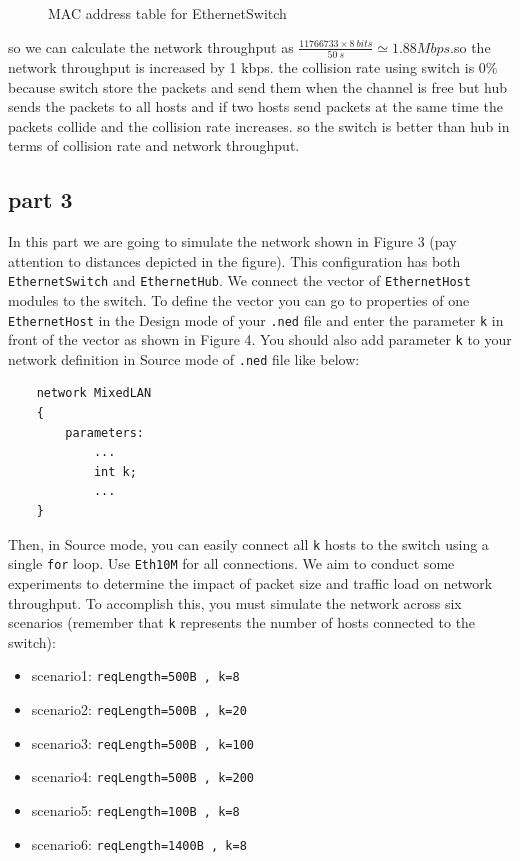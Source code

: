 \begin{qsolve}
\begin{qsolve}[]
\begin{figure}[H]
            \caption{MAC address table for EthernetSwitch}
        \end{figure}
        \splitqsolve[\splitqsolve]
        so we can calculate the network throughput as $\frac{11766733\times 8\ bits}{50\ s} \simeq  1.88 Mbps$.so the network throughput is increased by 1 kbps. the collision rate using switch is 0\% because switch store the packets and send them when the channel is free but hub sends the packets to all hosts and if two hosts send packets at the same time the packets collide and the collision rate increases. so the switch is better than hub in terms of collision rate and network throughput.
    \end{qsolve}
\end{qsolve}
\subsection{part 3}
In this part we are going to simulate the network shown in Figure 3 (pay attention to distances depicted in the figure). This configuration has both \texttt{EthernetSwitch} and \texttt{EthernetHub}. We connect the vector of \texttt{EthernetHost} modules to the switch. To define the vector you can go to properties of one \texttt{EthernetHost} in the Design mode of your \texttt{.ned} file and enter the parameter \texttt{k} in front of the vector as shown in Figure 4. You should also add parameter \texttt{k} to your network definition in Source mode of \texttt{.ned} file like below:
\begin{verbatim}
    network MixedLAN
    {
        parameters:
            ...
            int k;
            ...
    }
    \end{verbatim}
    
    Then, in Source mode, you can easily connect all \texttt{k} hosts to the switch using a single \texttt{for} loop. Use \texttt{Eth10M} for all connections. We aim to conduct some experiments to determine the impact of packet size and traffic load on network throughput. To accomplish this, you must simulate the network across six scenarios (remember that \texttt{k} represents the number of hosts connected to the switch):
    
    \begin{itemize}
        \item scenario1: \texttt{reqLength=500B , k=8}
        \item scenario2: \texttt{reqLength=500B , k=20}
        \item scenario3: \texttt{reqLength=500B , k=100}
        \item scenario4: \texttt{reqLength=500B , k=200}
        \item scenario5: \texttt{reqLength=100B , k=8}
        \item scenario6: \texttt{reqLength=1400B , k=8}
    \end{itemize}
    
